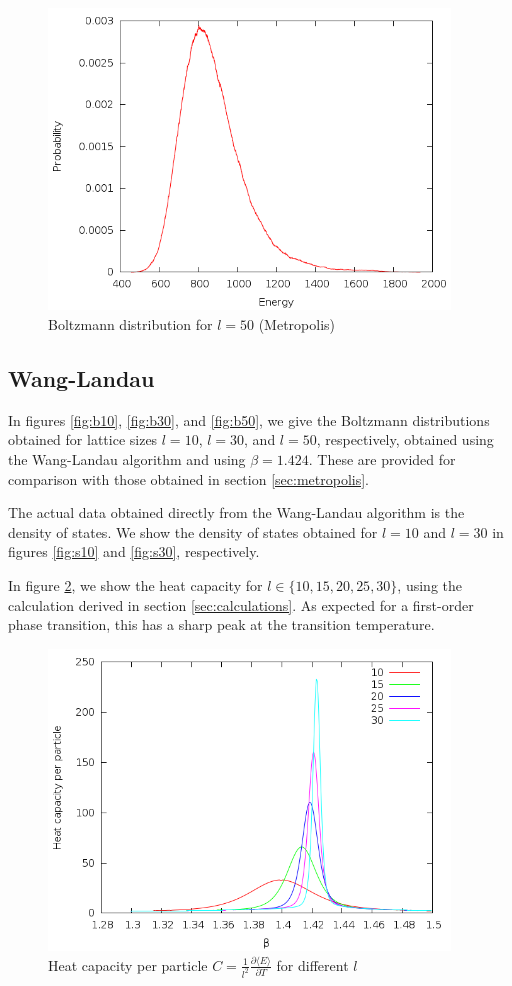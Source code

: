 \documentclass{article}
\begin{document}
\begin{figure}[h]
\includegraphics[height=8cm]{../results/metropolis/m50.png}
\caption{Boltzmann distribution for $l = 50$ (Metropolis)}
\label{fig:m50}
\end{figure}

\subsection{Wang-Landau}
In figures \ref{fig:b10}, \ref{fig:b30}, and \ref{fig:b50}, we give the Boltzmann distributions obtained for lattice sizes $l = 10$, $l = 30$, and $l = 50$, respectively, obtained using the Wang-Landau algorithm and using $\beta = 1.424$.
These are provided for comparison with those obtained in section \ref{sec:metropolis}.

The actual data obtained directly from the Wang-Landau algorithm is the density of states.
We show the density of states obtained for $l = 10$ and $l = 30$ in figures \ref{fig:s10} and \ref{fig:s30}, respectively.

In figure \ref{fig:capacity}, we show the heat capacity for $l \in\{10,15,20,25,30\}$, using the calculation derived in section \ref{sec:calculations}.
As expected for a first-order phase transition, this has a sharp peak at the transition temperature.

\begin{figure}[h]
\includegraphics[height=8cm]{../results/wanglandau/capacity.png}
\caption{Heat capacity per particle $C = \frac{1}{l^2}\frac{\partial\langle E\rangle}{\partial T}$ for different $l$}
\label{fig:capacity}
\end{figure}
\end{document}
